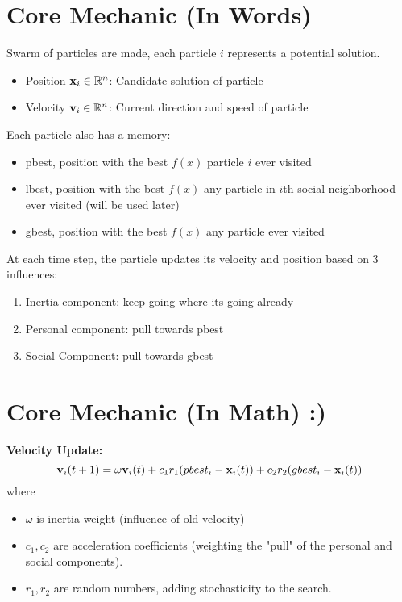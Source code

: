\section*{Core Mechanic (In Words)}

Swarm of particles are made, each particle $i$ represents a potential solution. 

\begin{itemize}
    \item Position $\mathbf{x}_i \in \mathbb{R}^n$: Candidate solution of particle
    \item Velocity $\mathbf{v}_i \in \mathbb{R}^n$: Current direction and speed of particle 
\end{itemize}

Each particle also has a memory:
\begin{itemize}
    \item pbest, position with the best $f(x)$ particle $i$ ever visited
    \item lbest, position with the best $f(x)$ any particle in $i$th social 
    neighborhood ever visited (will be used later)
    \item gbest, position with the best $f(x)$ any particle ever visited
\end{itemize}

At each time step, the particle updates its velocity and position based on 
3 influences:
\begin{enumerate}
    \item Inertia component: keep going where its going already
    \item Personal component: pull towards pbest 
    \item Social Component: pull towards gbest 
\end{enumerate}

\section*{Core Mechanic (In Math) :)}
\textbf{Velocity Update:} 
\[
\mathbf{v}_i(t+1) = \omega \mathbf{v}_i(t) + c_1 r_1 (pbest_i - \mathbf{x}_i(t)) + c_2 r_2 (gbest_i - \mathbf{x}_i(t))
\]
where 
\begin{itemize}
    \item $\omega$ is inertia weight (influence of old velocity)
    \item $c_1,c_2$ are acceleration coefficients (weighting the "pull" of the personal and social components).
    \item $r_1,r_2$ are random numbers, adding stochasticity to the search.
\end{itemize}

